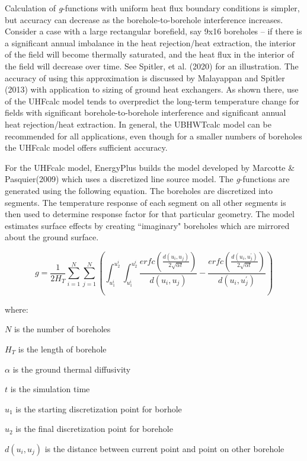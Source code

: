 Calculation of \emph{g}-functions with uniform heat flux boundary conditions is simpler, but accuracy can decrease as the borehole-to-borehole interference increases. Consider a case with a large rectangular borefield, say 9x16 boreholes – if there is a significant annual imbalance in the heat rejection/heat extraction, the interior of the field will become thermally saturated, and the heat flux in the interior of the field will decrease over time. See Spitler, et al. (2020) for an illustration. The accuracy of using this approximation is discussed by Malayappan and Spitler (2013) with application to sizing of ground heat exchangers. As shown there, use of the UHFcalc model tends to overpredict the long-term temperature change for fields with significant borehole-to-borehole interference and significant annual heat rejection/heat extraction. In general, the UBHWTcalc model can be recommended for all applications, even though for a smaller numbers of boreholes the UHFcalc model offers sufficient accuracy.

For the UHFcalc model, EnergyPlus builds the model developed by Marcotte \& Pasquier(2009) which uses a discretized line source model. The \emph{g}-functions are generated using the following equation. The boreholes are discretized into segments. The temperature response of each segment on all other segments is then used to determine response factor for that particular geometry. The model estimates surface effects by creating ``imaginary" boreholes which are mirrored about the ground surface.

\begin{equation}
g = \frac{1}{2 H_T} \sum_{i=1}^N \sum_{j=1}^N \left( \int_{u_1^i}^{u_2^i} \int_{u_1^i}^{u_2^i} \frac{erfc\left( \frac{d(u_i, u_j)}{2\sqrt{\alpha t}}\right)}{d(u_i, u_j)} - \frac{erfc\left( \frac{d(u_i, u_j^{'})}{2\sqrt{\alpha t}}\right)}{d(u_i, u_j^{'})}\right)
\end{equation}

where:

\(N\) is the number of boreholes

\(H_T\) is the length of borehole

\(\alpha\) is the ground thermal diffusivity

\(t\) is the simulation time

\(u_1\) is the starting discretization point for borhole

\(u_2\) is the final discretization point for borehole

\(d(u_i, u_j)\) is the distance between current point and point on other borehole

